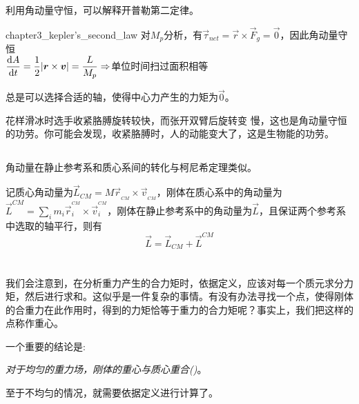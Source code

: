 利用角动量守恒，可以解释开普勒第二定律。
\begin{singlefigure}{chapter3_kepler's_second_law}
    对$M_p$分析，有$\vec{\tau}_{net}=\vec{r}\times\vec{F}_g=\vec{0}$，因此角动量守恒\\[1ex]
    $\dfrac{\dif A}{\dif t}=\dfrac{1}{2}|\vec{r}\times\vec{v}|=\dfrac{L}{M_p}\Rightarrow$单位时间扫过面积相等
\end{singlefigure}

总是可以选择合适的轴，使得中心力产生的力矩为$\vec{0}$。

花样滑冰时选手收紧胳膊旋转较快，而张开双臂后旋转变
慢，这也是角动量守恒的功劳。你可能会发现，收紧胳膊时，人的动能变大了，这是生物能的功劳。
\subsection[质心系转化]{}
角动量在静止参考系和质心系间的转化与柯尼希定理类似。
\begin{law}
    记质心角动量为$\vec{L}_{CM}=M\vec{r}_{_{CM}}\times\vec{v}_{_{CM}}$，刚体在质心系中的角动量为$\vec{L}^{CM}=\sum_im_i\vec{r}_i^{^{CM}}\times\vec{v}^{^{CM}}_i$，刚体在静止参考系中的角动量为$\vec{L}$，且保证两个参考系中选取的轴平行，则有
    \[\vec{L}=\vec{L}_{CM}+\vec{L}^{CM}\]
\end{law}
\section[重心]{}
我们会注意到，在分析重力产生的合力矩时，依据定义，应该对每一个质元求分力矩，然后进行求和。这似乎是一件复杂的事情。有没有办法寻找一个点，使得刚体的合重力在此作用时，得到的力矩恰等于重力的合力矩呢？事实上，我们把这样的点称作重心。

一个重要的结论是:
\begin{center}
    {\itshape 对于均匀的重力场，刚体的重心与质心重合()}。
\end{center}

至于不均匀的情况，就需要依据定义进行计算了。
\section[非惯性系情形]{}
